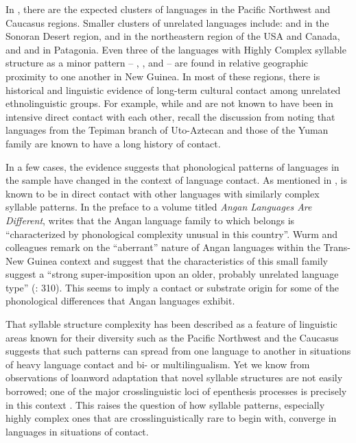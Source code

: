   In , there are the expected clusters of languages in the Pacific Northwest and Caucasus regions. Smaller clusters of unrelated languages include:  and  in the Sonoran Desert region,  and  in the northeastern region of the USA and Canada, and  and  in Patagonia. Even three of the languages with Highly Complex syllable structure as a minor pattern -- , , and  -- are found in relative geographic proximity to one another in New Guinea. In most of these regions, there is historical and linguistic evidence of long-term cultural contact among unrelated ethnolinguistic groups. For example, while  and  are not known to have been in intensive direct contact with each other, recall the discussion from  noting that languages from the Tepiman branch of Uto-Aztecan and those of the Yuman family are known to have a long history of contact. 

  In a few cases, the evidence suggests that phonological patterns of languages in the sample have changed in the context of language contact. As mentioned in ,  is known to be in direct contact with other languages with similarly complex syllable patterns. In the preface to a volume titled \textit{Angan Languages Are Different}, \citet[4]{Healey1981} writes that the Angan language family to which  belongs is “characterized by phonological complexity unusual in this country”. Wurm and colleagues remark on the “aberrant” nature of Angan languages within the Trans-New Guinea context and suggest that the characteristics of this small family suggest a “strong super-imposition upon an older, probably unrelated language type” (\citeyear{WurmEtAl1977}: 310). This seems to imply a contact or substrate origin for some of the phonological differences that Angan languages exhibit.

  That syllable structure complexity has been described as a feature of linguistic areas known for their diversity such as the Pacific Northwest and the Caucasus suggests that such patterns can spread from one language to another in situations of heavy language contact and bi- or multilingualism. Yet we know from observations of loanword adaptation that novel syllable structures are not easily borrowed; one of the major crosslinguistic loci of epenthesis processes is precisely in this context \citep{Hall2011}. This raises the question of how syllable patterns, especially highly complex ones that are crosslinguistically rare to begin with, converge in languages in situations of contact.

